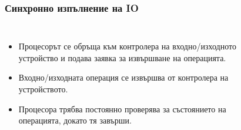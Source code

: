 \documentclass[ignorenonframetext, hyperref=unicode]{beamer}
\begin{document}
\begin{frame}
\frametitle{Синхронно изпълнение на IO}
\begin{columns}
\begin{itemize}
\item Процесорът се обръща към контролера на входно/изходното устройство и
подава заявка за извършване на операцията.
\item Входно/изходната операция се извършва от контролера на устройството.
\item Процесора трябва постоянно проверява за състоянието на операцията, докато
тя завърши. 
\end{itemize}
\begin{figure}[h]
\center
{}
\end{figure}
\end{columns}
\end{frame}
\end{document}
